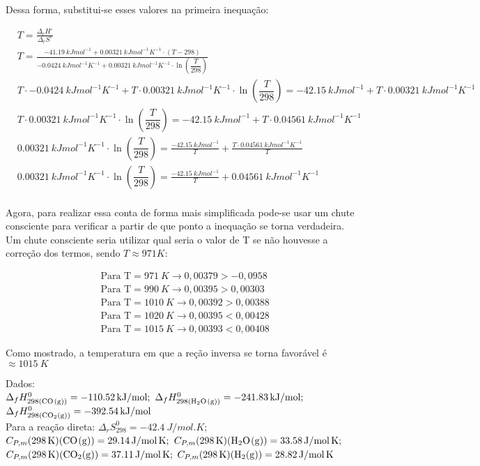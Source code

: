 Dessa forma, substitui-se esses valores na primeira inequação:

\begin{align*}
    &T = \frac{\Delta_rH^\circ}{\Delta_rS^\circ}\\ 
    &T = \frac{\qty{-41,19}{kJmol^{-1}} +\qty{0,00321}{kJmol^{-1}K^{-1}} \cdot
    (T - 298)}{\qty{-0,0424}{kJmol^{-1}K^{-1}} +\qty{0,00321}{kJmol^{-1}K^{-1}}
    \cdot \ln (\dfrac{T}{298})} \\  
    &T \cdot \qty{-0,0424}{kJmol^{-1}K^{-1}} + T \cdot
        \qty{0,00321}{kJmol^{-1}K^{-1}} \cdot  \ln (\dfrac{T}{298}) =
    \qty{-42,15}{kJmol^{-1}} + T \cdot \qty{0,00321}{kJmol^{-1}K^{-1}} \\
    &T \cdot \qty{0,00321}{kJmol^{-1}K^{-1}} \cdot \ln (\dfrac{T}{298}) =
       \qty{-42,15}{kJmol^{-1}} + T \cdot \qty{0,04561}{kJmol^{-1}K^{-1}}\\
    &\qty{0,00321}{kJmol^{-1}K^{-1}} \cdot \ln (\dfrac{T}{298}) =
    \frac{\qty{-42,15}{kJmol^{-1}}}{T}  + \frac{T \cdot \qty{0,04561}{kJmol^{-1}K^{-1}}}{T} \\
    &\qty{0,00321}{kJmol^{-1}K^{-1}} \cdot \ln (\dfrac{T}{298}) = \frac{\qty{-42,15}{kJmol^{-1}}}{T}  + \qty{0,04561}{kJmol^{-1}K^{-1}} \\
\end{align*}

 Agora, para realizar essa conta de forma mais simplificada pode-se usar um chute consciente para verificar a partir de que ponto a inequação se torna verdadeira. Um chute consciente seria utilizar qual seria o valor de T se não houvesse a correção dos termos, sendo \(T \approx 971 K\):
 
 \begin{align*}
 	&\text{Para T} = \qty{971}{K} \rightarrow 0,00379 > -0,0958 \\
 	&\text{Para T} = \qty{990}{K} \rightarrow 0,00395 > 0,00303 \\
 	&\text{Para T} = \qty{1010}{K} \rightarrow 0,00392 > 0,00388 \\
 	&\text{Para T} = \qty{1020}{K} \rightarrow 0,00395 < 0,00428 \\
 	&\text{Para T} = \qty{1015}{K} \rightarrow 0,00393 < 0,00408 
 \end{align*}
 
 Como mostrado, a temperatura em que a reção inversa se torna favorável é $\approx \qty{1015}{K}$ 
  
\noindent Dados:\\
\( \Delta_f H^0_{298(\ce{CO(g)})} = \qty{-110.52}{kJ \per mol};\) 
\( \Delta_f H^0_{298(\ce{H2O(g)})} = \qty{-241.83}{kJ \per mol};\) 
\( \Delta_f H^0_{298(\ce{CO2(g)})} = \qty{-392.54}{kJ \per mol}\) \\
Para a reação direta: \( \Delta _r S^0_{298} = \qty{-42.4}{J \per mol . K} \);\\
\(C_{P,m} (\qty{298}{K}) (\ce{CO(g)}) = \qty{29.14}{J \per mol . K}; \)
\(C_{P,m} (\qty{298}{K}) (\ce{H2O(g)}) = \qty{33.58}{J \per mol . K}; \)\\
\(C_{P,m} (\qty{298}{K}) (\ce{CO2(g)}) = \qty{37.11}{J \per mol . K}; \)
\(C_{P,m} (\qty{298}{K}) (\ce{H2(g)}) = \qty{28.82}{J \per mol . K} \)
